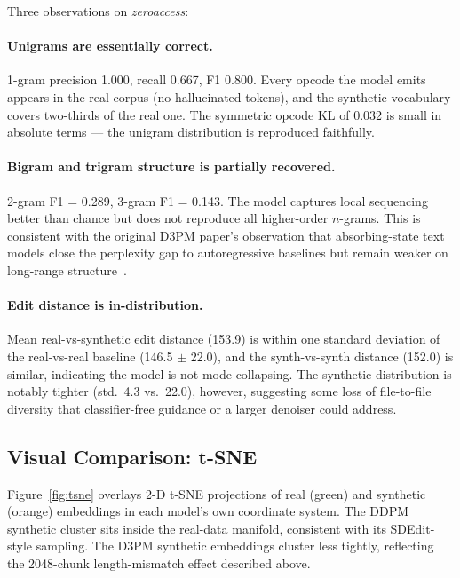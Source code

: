 \documentclass[runningheads]{llncs}
\begin{document}
Three observations on \emph{zeroaccess}:

\paragraph{Unigrams are essentially correct.}
1-gram precision 1.000, recall 0.667, F1 0.800. Every opcode the model emits
appears in the real corpus (no hallucinated tokens), and the synthetic
vocabulary covers two-thirds of the real one. The symmetric opcode KL of
0.032 is small in absolute terms --- the unigram distribution is reproduced
faithfully.

\paragraph{Bigram and trigram structure is partially recovered.}
2-gram F1 = 0.289, 3-gram F1 = 0.143. The model captures local sequencing
better than chance but does not reproduce all higher-order $n$-grams. This is
consistent with the original D3PM paper's observation that absorbing-state
text models close the perplexity gap to autoregressive baselines but remain
weaker on long-range structure~\cite{austin2021d3pm}.

\paragraph{Edit distance is in-distribution.}
Mean real-vs-synthetic edit distance (153.9) is within one standard deviation
of the real-vs-real baseline (146.5 $\pm$ 22.0), and the synth-vs-synth
distance (152.0) is similar, indicating the model is not mode-collapsing.
The synthetic distribution is notably tighter (std.\ 4.3 vs.\ 22.0), however,
suggesting some loss of file-to-file diversity that classifier-free guidance
or a larger denoiser could address.

\subsection{Visual Comparison: t-SNE}

Figure~\ref{fig:tsne} overlays 2-D t-SNE projections of real (green) and
synthetic (orange) embeddings in each model's own coordinate system. The DDPM
synthetic cluster sits inside the real-data manifold, consistent with its
SDEdit-style sampling. The D3PM synthetic embeddings cluster less tightly,
reflecting the 2048-chunk length-mismatch effect described above.
\end{document}
